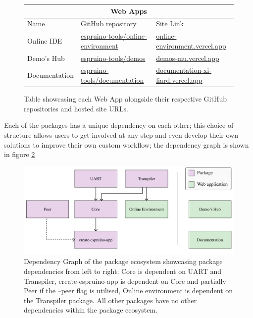 \documentclass{l4proj}
\begin{document}
\begin{figure}[!ht]
\begin{center}
\begin{tabular}{|p{2.25cm}|p{5.25cm}|p{5.25cm}|}
\hline
\multicolumn{3}{|c|}{Web Apps} \\
 \hline
 Name & GitHub repository & Site Link\\
 \hline
Online IDE & \href{https://github.com/espruino-tools/online-environment}{espruino-tools/online-environment} & \href{https://online-environment.vercel.app/}{online-environment.vercel.app} \\
Demo's Hub & \href{https://github.com/espruino-tools/demos}{espruino-tools/demos}  & \href{https://demos-mu.vercel.app/}{demos-mu.vercel.app} \\
Documentation & \href{https://github.com/espruino-tools/documentation}{espruino-tools/documentation} & \href{https://documentation-xi-liard.vercel.app/}{documentation-xi-liard.vercel.app} \\
 \hline
\end{tabular}
\end{center}
\caption{Table showcasing each Web App alongside their respective GitHub repositories and hosted site URLs.}
\label{fig:webapps}
\end{figure}

Each of the packages has a unique dependency on each other; this choice of structure allows users to get involved at any step and even develop their own solutions to improve their own custom workflow; the dependency graph is shown in figure \ref{fig:package_dep_graph}


\begin{figure}[!ht]
    \centering
    \includegraphics[width=12cm]{dissertation/images/Package_dependency_graph.jpeg}
    \caption{Dependency Graph of the package ecosystem showcasing package dependencies from left to right; Core is dependent on UART and Transpiler, create-espruino-app is dependent on Core and partially Peer if the --peer flag is utilised, Online environment is dependent on the Transpiler package. All other packages have no other dependencies within the package ecosystem.}
    \label{fig:package_dep_graph}
\end{figure}
\end{document}
